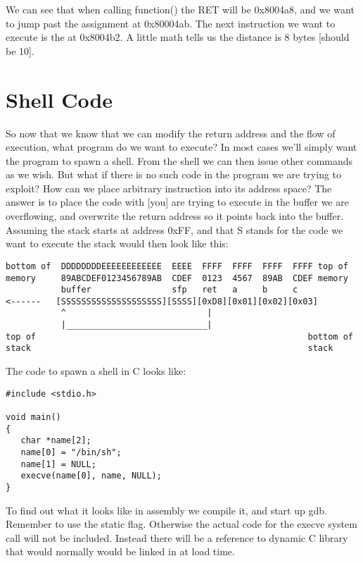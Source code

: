 \documentclass[12pt]{article}
\begin{document}
We can see that when calling function() the RET will be 0x8004a8, and we want to jump past the assignment at 
0x80004ab. The next instruction we want to execute is the at 0x8004b2. A little math tells us the distance is 8 
bytes [should be 10]. 

\section{Shell Code}

So now that we know that we can modify the return address and the flow of execution, what program do we 
want to execute? In most cases we'll simply want the program to spawn a shell. From the shell we can then issue 
other commands as we wish. But what  if there is no such code in the program we are trying to exploit? How can 
we place arbitrary instruction into its address space? The answer is to place the code with [you] are trying to 
execute in the buffer we are overflowing, and overwrite the return address so it points back into the buffer. 
Assuming the stack starts at address 0xFF, and that S stands for the code we want to execute the stack would 
then look like this:

{\scriptsize
\begin{verbatim}
bottom of  DDDDDDDDEEEEEEEEEEEE  EEEE  FFFF  FFFF  FFFF  FFFF top of
memory     89ABCDEF0123456789AB  CDEF  0123  4567  89AB  CDEF memory           
           buffer                sfp   ret   a     b     c
<------   [SSSSSSSSSSSSSSSSSSSS][SSSS][0xD8][0x01][0x02][0x03]
           ^                            |
           |____________________________|
top of                                                      bottom of
stack                                                       stack
\end{verbatim}
}
  

The code to spawn a shell in C looks like:

\begin{lstlisting}[caption=shellcode.c]
#include <stdio.h>

void main() 
{
   char *name[2];
   name[0] = "/bin/sh";
   name[1] = NULL;
   execve(name[0], name, NULL);
}
\end{lstlisting}

To find out what it looks like in assembly we compile it, and start up gdb. Remember to use the  static flag. 
Otherwise the actual code  for the execve system call will not be included. Instead there will be a reference to 
dynamic C library that would normally would be linked in at load time. 
\end{document}
